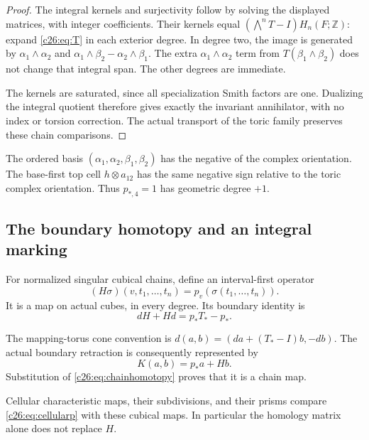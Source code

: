 \begin{proof}
The integral kernels and surjectivity follow by solving the displayed
matrices, with integer coefficients. Their kernels equal
$(\bigwedge^nT-I)H_n(F;\mathbb Z)$: expand \eqref{c26:eq:T} in each
exterior degree. In degree two, the image is generated by
$\alpha_1\wedge\alpha_2$ and
$\alpha_1\wedge\beta_2-\alpha_2\wedge\beta_1$.
The extra $\alpha_1\wedge\alpha_2$ term from $T(\beta_1\wedge\beta_2)$
does not change that integral span. The other degrees are immediate.

The kernels are saturated, since all specialization Smith factors are one.
Dualizing the integral quotient therefore gives exactly the invariant
annihilator, with no index or torsion correction.
The actual transport of the toric family preserves these chain comparisons.
\end{proof}

The ordered basis $(\alpha_1,\alpha_2,\beta_1,\beta_2)$ has the negative
of the complex orientation. The base-first top cell
$h\otimes a_{12}$ has the same negative sign relative to the toric
complex orientation. Thus $p_{*,4}=1$ has geometric degree $+1$.

\subsection{The boundary homotopy and an integral marking}

For normalized singular cubical chains, define an interval-first operator
\begin{equation}\label{c26:eq:H}
(H\sigma)(v,t_1,\ldots,t_n)=p_v(\sigma(t_1,\ldots,t_n)).
\end{equation}
It is a map on actual cubes, in every degree. Its boundary identity is
\begin{equation}\label{c26:eq:chainhomotopy}
dH+Hd=p_*T_*-p_*.
\end{equation}

The mapping-torus cone convention is
$d(a,b)=(da+(T_*-I)b,-db)$.
The actual boundary retraction is consequently represented by
\begin{equation}\label{c26:eq:Kchain}
K(a,b)=p_*a+Hb.
\end{equation}
Substitution of \eqref{c26:eq:chainhomotopy} proves that it is a chain map.

Cellular characteristic maps, their subdivisions, and their prisms
compare \eqref{c26:eq:cellularp} with these cubical maps.
In particular the homology matrix alone does not replace $H$.

